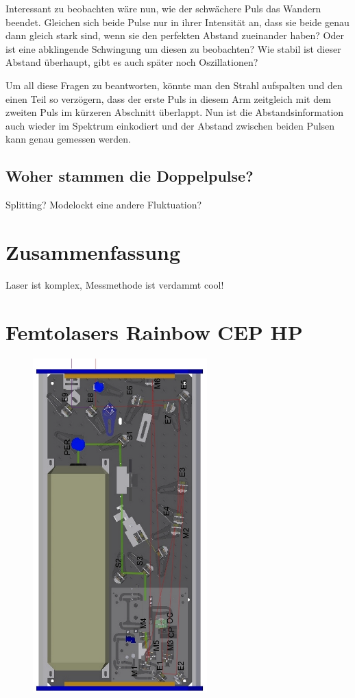 \documentclass[bachelor,       %
               twoside,        %
               BCOR10mm,       %
               english,ngerman, %
               ]{GAUBM}
\begin{document}
Interessant zu beobachten wäre nun, wie der schwächere Puls das Wandern beendet.
Gleichen sich beide Pulse nur in ihrer Intensität an, dass sie beide genau dann gleich stark sind, wenn sie den perfekten Abstand zueinander haben?
Oder ist eine abklingende Schwingung um diesen zu beobachten?
Wie stabil ist dieser Abstand überhaupt, gibt es auch später noch Oszillationen?

Um all diese Fragen zu beantworten, könnte man den Strahl aufspalten und den einen Teil so verzögern, dass der erste Puls in diesem Arm zeitgleich mit dem zweiten Puls im kürzeren Abschnitt überlappt.
Nun ist die Abstandsinformation auch wieder im Spektrum einkodiert und der Abstand zwischen beiden Pulsen kann genau gemessen werden.

\section{Woher stammen die Doppelpulse?}
Splitting?
Modelockt eine andere Fluktuation?


\chapter{Zusammenfassung}
Laser ist komplex, Messmethode ist verdammt cool!

\appendix
\chapter{Femtolasers Rainbow CEP HP}
\begin{figure}[!htb]
	\centering
	\includegraphics[width=0.6\textwidth]{figures/RainbowSetupManual.png}
\end{figure}
\end{document}
